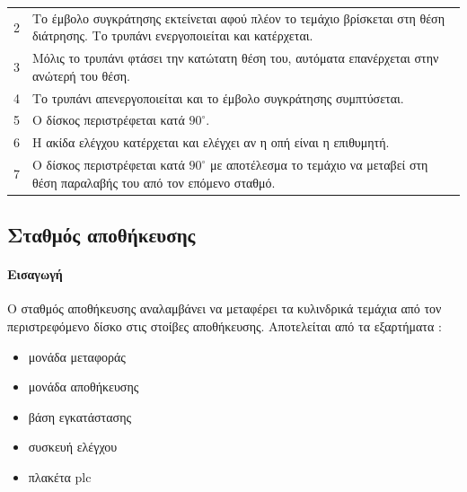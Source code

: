 \documentclass[a4paper,12pt,twoside]{report}
\begin{document}
{\begin{longtable} { m{0.5cm} m{12cm} }
					2 & Το έμβολο συγκράτησης εκτείνεται αφού πλέον το τεμάχιο βρίσκεται στη θέση διάτρησης. Το τρυπάνι ενεργοποιείται και κατέρχεται.\\
					3 & Μόλις το τρυπάνι φτάσει την κατώτατη θέση του, αυτόματα επανέρχεται στην ανώτερή του θέση.\\
					4 & Το τρυπάνι απενεργοποιείται και το έμβολο συγκράτησης συμπτύσεται.\\
					5 & Ο δίσκος περιστρέφεται κατά $90^{\circ}$.\\
					6 & Η ακίδα ελέγχου κατέρχεται και ελέγχει αν η οπή είναι η επιθυμητή.\\
					7 & Ο δίσκος περιστρέφεται κατά $90^{\circ}$ με αποτέλεσμα το τεμάχιο να μεταβεί στη θέση παραλαβής του από τον επόμενο σταθμό.\\
					\hline
				\end{longtable}

			\FloatBarrier
			\subsection{Σταθμός αποθήκευσης \cite{FestoMPSHandlingStationManual} \cite{ΤοΦυσικόΣύστημαFestoMPS} \cite{UMLΕνσωματωμέναΣυστήματα}}
			
			\label{ενότ:Σταθμός αποθήκευσης}
				\paragraph{Εισαγωγή} {Ο σταθμός αποθήκευσης αναλαμβάνει να μεταφέρει τα κυλινδρικά τεμάχια από τον περιστρεφόμενο δίσκο στις στοίβες αποθήκευσης. Αποτελείται από τα εξαρτήματα :
				}
				\begin{itemize}
					\item μονάδα μεταφοράς
					\item μονάδα αποθήκευσης
					\item βάση εγκατάστασης
					\item συσκευή ελέγχου
					\item πλακέτα plc
				\end{itemize}
}
\end{document}
